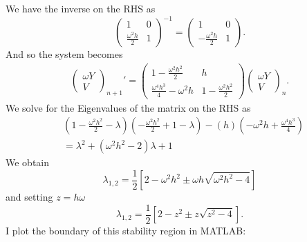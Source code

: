 \documentclass[11pt]{article}
\def\f{\frac }
\begin{document}
\begin{enumerate}
We have the inverse on the RHS as
\[ \left ( \begin{array}{cc}  1 & 0 \\ \f{\omega ^2 h}{2} & 1 \end{array} \right ) ^{-1} = \left ( \begin{array}{cc}  1 & 0 \\ - \f{\omega ^2 h}{2} & 1 \end{array} \right ). \]
And so the system becomes
\begin{align*}  \left ( \begin{array}{c}  \omega Y \\ V \end{array} \right )_{n+1} ' = \left ( \begin{array}{cc}  1 - \f{\omega ^2 h^2}{2} & h \\ \f{\omega ^4 h^3}{4} -\omega ^2 h & 1 - \f{\omega ^2 h^2}{2} \end{array} \right )  \left ( \begin{array}{c} \omega Y \\ V \end{array} \right ) _n. \end{align*}
We solve for the Eigenvalues of the matrix on the RHS as
\begin{align*} & \left ( 1 - \f{\omega ^2 h^2 }{2} - \lambda \right ) \left ( - \f{\omega ^2 h^2 }{2} + 1 - \lambda \right ) - (h) \left ( -\omega ^2 h + \f{\omega ^4 h ^3 }{4} \right ) \\
&= \lambda^2 + (\omega ^2 h^2 - 2) \lambda +1 \end{align*}
We obtain
\[ \lambda_{1,2} = \f{1}{2} \left [  2 - \omega ^2 h ^2 \pm \omega h \sqrt{\omega^2 h^2 - 4} \right ] \]
and setting $z = h \omega$
\[ \lambda_{1,2} = \f{1}{2} \left [  2 - z^2 \pm z \sqrt{z ^2 - 4} \right ] .\]
I plot the boundary of this stability region in MATLAB:




\end{enumerate}
\end{document}
